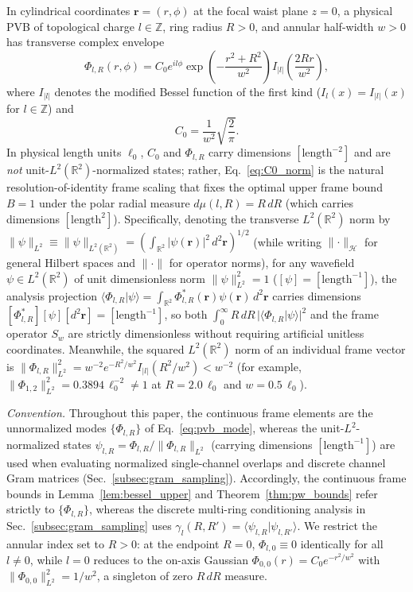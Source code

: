 \documentclass[aps,pra,onecolumn,notitlepage,11pt,tightenlines,nofootinbib,floatfix,longbibliography]{revtex4-2}
\theoremstyle{remark}
\newcommand{\braket}[2]{\langle #1 | #2 \rangle}
\newcommand{\norm}[1]{\lVert #1 \rVert}
\newcommand{\abs}[1]{\lvert #1 \rvert}
\begin{document}
In cylindrical coordinates $\mathbf{r} = (r,\phi)$ at the focal waist plane $z = 0$, a physical PVB of topological charge $l \in \mathbb{Z}$, ring radius $R > 0$, and annular half-width $w > 0$ has transverse complex envelope~\cite{Ostrovsky2013,Vaity2015}
\begin{equation}
\Phi_{l,R}(r,\phi) = C_0 e^{il\phi} \exp\!\left(-\frac{r^2 + R^2}{w^2}\right) I_{\abs{l}}\!\left(\frac{2Rr}{w^2}\right),
\label{eq:pvb_mode}
\end{equation}
where $I_{\abs{l}}$ denotes the modified Bessel function of the first kind ($I_l(x) = I_{\abs{l}}(x)$ for $l \in \mathbb{Z}$) and
\begin{equation}
C_0 = \frac{1}{w^2}\sqrt{\frac{2}{\pi}}.
\label{eq:C0_norm}
\end{equation}
In physical length units $\ell_0$, $C_0$ and $\Phi_{l,R}$ carry dimensions $[\mathrm{length}^{-2}]$ and are \emph{not} unit-$L^2(\mathbb{R}^2)$-normalized states; rather, Eq.~\eqref{eq:C0_norm} is the natural resolution-of-identity frame scaling that fixes the optimal upper frame bound $B = 1$ under the polar radial measure $d\mu(l,R) = R\,dR$ (which carries dimensions $[\mathrm{length}^2]$). Specifically, denoting the transverse $L^2(\mathbb{R}^2)$ norm by $\norm{\psi}_{L^2} \equiv \norm{\psi}_{L^2(\mathbb{R}^2)} = (\int_{\mathbb{R}^2}\abs{\psi(\mathbf{r})}^2\,d^2\mathbf{r})^{1/2}$ (while writing $\norm{\cdot}_{\mathcal{H}}$ for general Hilbert spaces and $\norm{\cdot}$ for operator norms), for any wavefield $\psi \in L^2(\mathbb{R}^2)$ of unit dimensionless norm $\norm{\psi}_{L^2}^2 = 1$ ($[\psi] = [\mathrm{length}^{-1}]$), the analysis projection $\braket{\Phi_{l,R}}{\psi} = \int_{\mathbb{R}^2}\Phi_{l,R}^*(\mathbf{r})\psi(\mathbf{r})\,d^2\mathbf{r}$ carries dimensions $[\Phi_{l,R}^*][\psi][d^2\mathbf{r}] = [\mathrm{length}^{-1}]$, so both $\int_0^\infty R\,dR\,\abs{\braket{\Phi_{l,R}}{\psi}}^2$ and the frame operator $S_w$ are strictly dimensionless without requiring artificial unitless coordinates. Meanwhile, the squared $L^2(\mathbb{R}^2)$ norm of an individual frame vector is $\norm{\Phi_{l,R}}_{L^2}^2 = w^{-2} e^{-R^2/w^2} I_{\abs{l}}(R^2/w^2) < w^{-2}$ (for example, $\norm{\Phi_{1,2}}_{L^2}^2 = 0.3894\,\ell_0^{-2} \neq 1$ at $R = 2.0\,\ell_0$ and $w = 0.5\,\ell_0$).

\emph{Convention.} Throughout this paper, the continuous frame elements are the unnormalized modes $\{\Phi_{l,R}\}$ of Eq.~\eqref{eq:pvb_mode}, whereas the unit-$L^2$-normalized states $\psi_{l,R} = \Phi_{l,R}/\norm{\Phi_{l,R}}_{L^2}$ (carrying dimensions $[\mathrm{length}^{-1}]$) are used when evaluating normalized single-channel overlaps and discrete channel Gram matrices (Sec.~\ref{subsec:gram_sampling}). Accordingly, the continuous frame bounds in Lemma~\ref{lem:bessel_upper} and Theorem~\ref{thm:pw_bounds} refer strictly to $\{\Phi_{l,R}\}$, whereas the discrete multi-ring conditioning analysis in Sec.~\ref{subsec:gram_sampling} uses $\gamma_l(R,R') = \braket{\psi_{l,R}}{\psi_{l,R'}}$. We restrict the annular index set to $R > 0$: at the endpoint $R = 0$, $\Phi_{l,0} \equiv 0$ identically for all $l \neq 0$, while $l = 0$ reduces to the on-axis Gaussian $\Phi_{0,0}(r) = C_0 e^{-r^2/w^2}$ with $\norm{\Phi_{0,0}}_{L^2}^2 = 1/w^2$, a singleton of zero $R\,dR$ measure.
\end{document}
